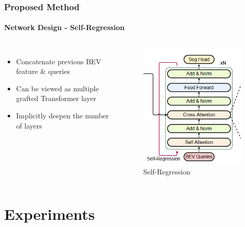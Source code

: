 \documentclass[
	12pt, %
	aspectratio=169, %
]{beamer}
\begin{document}
\begin{frame}
	\frametitle{Proposed Method}
	\framesubtitle{Network Design - Self-Regression}

	\begin{columns}
		\begin{itemize}
			\item Concatenate previous BEV feature \& queries
			\item Can be viewed as multiple grafted Transformer layer
			\item Implicitly deepen the number of layers
		\end{itemize}

		\begin{figure}
			\centering
			\includegraphics[width=0.8\linewidth]{"./Images/self_regression.png"}
			\caption{Self-Regression}
		\end{figure}
	\end{columns}
\end{frame}


\section{Experiments}
\end{document}
